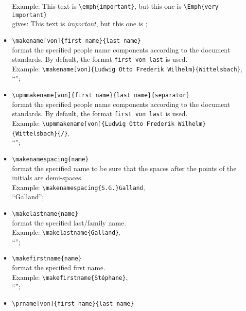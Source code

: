 \documentclass[book]{upmethodology-document}
\begin{document}
\begin{itemize}
	Example: This text is \texttt{{\textbackslash}emph\{important\}}, but this one is \texttt{{\textbackslash}Emph\{very important\}} \\
	gives: This text is \emph{important}, but this one is ;
\item \texttt{{\textbackslash}makename[von]\{first name\}\{last name\}} \\
	format the specified people name components according to the document standards. By default, the format \texttt{first von last} is used. \\
	Example: \texttt{{\textbackslash}makename[von]\{Ludwig Otto Frederik Wilhelm\}\{Wittelsbach\}},\\
		``'';
\item \texttt{{\textbackslash}upmmakename[von]\{first name\}\{last name\}\{separator\}} \\
	format the specified people name components according to the document standards. By default, the format \texttt{first von last} is used. \\
	Example: \texttt{{\textbackslash}upmmakename[von]\{Ludwig Otto Frederik Wilhelm\}\{Wittelsbach\}\{/\}}, \\
		``'';
\item \texttt{{\textbackslash}makenamespacing\{name\}} \\
	format the specified name to be sure that the spaces after the points of the initials are demi-spaces. \\
	Example: \texttt{{\textbackslash}makenamespacing\{S\string.G\string.\}Galland}, \\
		``Galland'';
\item \texttt{{\textbackslash}makelastname\{name\}} \\
	format the specified last/family name. \\
	Example: \texttt{{\textbackslash}makelastname\{Galland\}}, \\
		``'';
\item \texttt{{\textbackslash}makefirstname\{name\}} \\
	format the specified first name. \\
	Example: \texttt{{\textbackslash}makefirstname\{St\'ephane\}}, \\
		``'';
\item \texttt{{\textbackslash}prname[von]\{first name\}\{last name\}} \\

\end{itemize}
\end{document}
